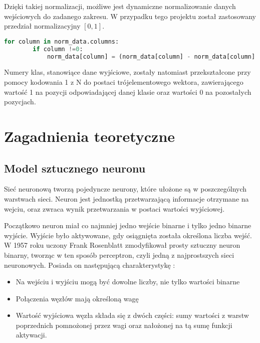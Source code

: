 \documentclass[12pt,twoside]{article}
\begin{document}
Dzięki takiej normalizacji, możliwe jest dynamiczne normalizowanie danych wejściowych do zadanego zakresu. W przypadku tego projektu został zastosowany przedział normalizacyjny $ [0, 1]$.\\

\begin{lstlisting}[language=Python,caption=Algorytm normalizacji,label={Kod1}]
    for column in norm_data.columns:
        if column !=0:
            norm_data[column] = (norm_data[column] - norm_data[column].min()) / (norm_data[column].max() - norm_data[column].min())

\end{lstlisting}

Numery klas, stanowiące dane wyjściowe, zostały natomiast przekształcone przy pomocy kodowania 1 z N do postaci trójelementowego wektora, zawierającego wartość 1 na pozycji odpowiadającej danej klasie oraz wartości 0 na pozostałych pozycjach.



\clearpage
\section{Zagadnienia teoretyczne}
\subsection{Model sztucznego neuronu}
Sieć neuronową  tworzą pojedyncze neurony, które ułożone są w poszczególnych warstwach sieci. Neuron jest jednostką przetwarzającą informacje otrzymane na wejciu, oraz zwraca wynik przetwarzania w postaci wartości wyjściowej. 


Początkowo neuron miał co najmniej jedno wejście binarne i tylko jedno binarne wyjście. Wyjście było aktywowane, gdy osiągnięta została określona liczba wejść. W 1957 roku uczony Frank Rosenblatt zmodyfikował prosty sztuczny neuron binarny, tworząc w ten sposób perceptron, czyli jedną z najprostszych sieci neuronowych. Posiada on następującą charakterystykę \cite{mamczur}:
\begin{itemize}
\item Na wejściu i wyjściu mogą być dowolne liczby, nie tylko wartości binarne 
\item Połączenia węzłów mają określoną wagę
\item Wartość wyjściowa węzła składa się z dwóch części: sumy wartości z warstw poprzednich pomnożonej przez wagi oraz nałożonej na tą sumę funkcji aktywacji.
\end{itemize}
\end{document}
